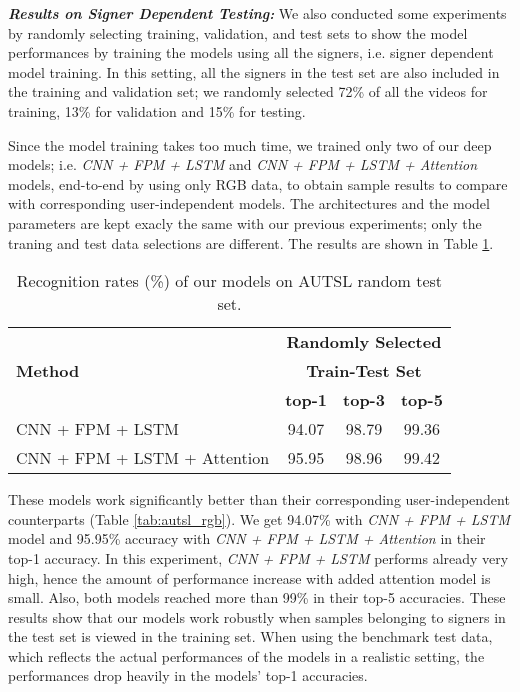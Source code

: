 \documentclass[11pt, a4paper, singlecolumn]{article}
\begin{document}
\textit{\textbf{Results on Signer Dependent Testing: }} We also conducted some experiments by randomly selecting training, validation, and test sets to show the model performances by training the models using all the signers, i.e. signer dependent model training. In this setting, all the signers in the test set are also included in the training and validation set; we randomly selected 72\% of all the videos for training, 13\% for validation and 15\% for testing. 

Since the model training takes too much time, we trained only two of our deep models; i.e. \textit{CNN + FPM + LSTM} and \textit{CNN + FPM + LSTM + Attention} models, end-to-end by using only RGB data, to obtain sample results to compare with corresponding user-independent models.  The architectures and the model parameters are kept exacly the same with our previous experiments; only the traning and test data selections are different. The results are shown in Table \ref{tab:autsl_random}. 
\begin{table} 
	\caption{Recognition rates (\%) of our models on AUTSL random test set.}
	\centering
	\begin{tabular}{l|ccc}
		\hline
		\multirow{3}{*}{\textbf{Method}} &
		
		\multicolumn{3}{c}{\textbf{Randomly Selected}}  \\ 
		& \multicolumn{3}{c}{\textbf{Train-Test Set}}  \\ 
		& {\textbf{top-1}} & {\textbf{top-3}} & {\textbf{top-5}} \\ \hline
		
		CNN + FPM + LSTM  & 94.07 & 98.79 & 99.36 \\
		CNN + FPM + LSTM + Attention   & 95.95 & 98.96 & 99.42 \\  \hline		
		
	\end{tabular}
	\label{tab:autsl_random}
\end{table}

These models work significantly better than their corresponding user-independent counterparts (Table \ref{tab:autsl_rgb}). We get 94.07\% with \textit{CNN + FPM + LSTM} model and 95.95\% accuracy with \textit{CNN + FPM + LSTM + Attention} in their top-1 accuracy. In this experiment, \textit{CNN + FPM + LSTM} performs already very high, hence the amount of performance increase with added attention model is small. Also, both models reached more than 99\% in their top-5 accuracies. These results show that our models work robustly when samples belonging to signers in the test set is viewed in the training set. When using the benchmark test data, which reflects the actual performances of the models in a realistic setting, the performances drop heavily in the models' top-1 accuracies. 
\end{document}
